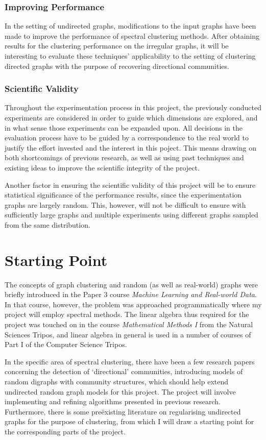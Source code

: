 \subsubsection{Improving Performance}
In the setting of undirected graphs, modifications to the input graphs have been made to improve the
performance of spectral clustering methods. After obtaining results for the clustering performance 
on the irregular graphs, it will be interesting to evaluate these techniques' applicability to 
the setting of clustering directed graphs with the purpose of recovering directional communities.

\subsubsection{Scientific Validity}
Throughout the experimentation process in this project, the previously conducted experiments are
considered in order to guide which dimensions are explored, and in what sense those experiments can
be expanded upon. All decisions in the evaluation process have to be guided by a correspondence to
the real world to justify the effort invested and the interest in this poject. This means drawing 
on both shortcomings of previous research, as well as using past techniques and existing ideas to
improve the scientific integrity of the project.

Another factor in ensuring the scientific validity of this project will be to ensure statistical 
significance of the performance results, since the experimentation graphs are largely random. This,
however, will not be difficult to ensure with sufficiently large graphs and multiple experiments 
using different graphs sampled from the same distribution.

\section{Starting Point}
The concepts of graph clustering and random (as well as real-world) graphs were briefly 
introduced in the Paper 3 course \emph{Machine Learning and Real-world Data}. In that 
course, however, the problem was approached programmatically where my project will employ 
spectral methods. The linear algebra thus required for the project was touched on in the 
course \emph{Mathematical Methods I} from the Natural Sciences Tripos, and linear algebra 
in general is used in a number of courses of Part I of the Computer Science Tripos. 
\par
In the specific area of spectral clustering, there have been a few research papers 
concerning the detection of `directional' communities, introducing models of random 
digraphs with community structures, which should help extend undirected random graph models for this project. 
The project will involve implementing and refining algorithms presented in previous research. 
Furthermore, there is some pre\"existing literature on regularising undirected graphs for 
the purpose of clustering, 
from which I will draw a starting point for the corresponding 
parts of the project.

